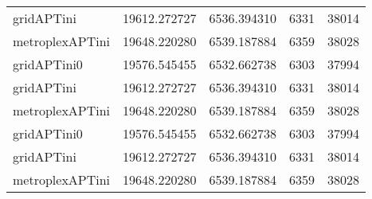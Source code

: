 \begin{tabular}{lrrrr}
gridAPTini & 19612.272727 & 6536.394310 & 6331 & 38014 \\
metroplexAPTini & 19648.220280 & 6539.187884 & 6359 & 38028 \\
gridAPTini0 & 19576.545455 & 6532.662738 & 6303 & 37994 \\
gridAPTini & 19612.272727 & 6536.394310 & 6331 & 38014 \\
metroplexAPTini & 19648.220280 & 6539.187884 & 6359 & 38028 \\
gridAPTini0 & 19576.545455 & 6532.662738 & 6303 & 37994 \\
gridAPTini & 19612.272727 & 6536.394310 & 6331 & 38014 \\
metroplexAPTini & 19648.220280 & 6539.187884 & 6359 & 38028 \\
\bottomrule
\end{tabular}
